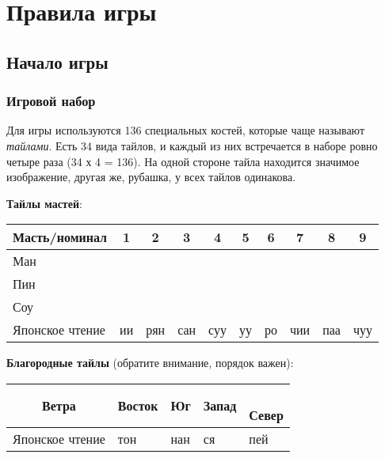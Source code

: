 \section{Правила игры}

\subsection{Начало игры}

\subsubsection{Игровой набор}

Для игры используются 136 специальных костей, которые чаще называют \textit{тайлами}. Есть 34 вида тайлов, и каждый из них встречается в наборе ровно четыре раза (34 х 4 = 136). На одной стороне тайла находится значимое изображение, другая же, рубашка, у всех тайлов одинакова.

\textbf{Тайлы мастей}:

\noindent\begin{tabular}{ C{3.5cm}ccccccccc } 
	\toprule
	Масть/номинал & 1 & 2 & 3 & 4 & 5 & 6 & 7 & 8 & 9 \\
	\midrule
	Ман \newline &  &  &  &  &  &  &  &  &  \rule[1ex]{0pt}{7ex} \\
	\midrule
	Пин \newline &  &  &  &  &  &  &  &  &  \rule[1ex]{0pt}{7ex} \\
	\midrule
	Соу \newline &  &  &  &  &  &  &  &  &  \rule[1ex]{0pt}{7ex} \\
	\midrule
	Японское чтение & ии & рян & сан & суу & уу & ро & чии & паа & чуу \rule[1ex]{0pt}{2ex} \\
	\bottomrule 
\end{tabular}

\vspace{1cm}

\textbf{Благородные тайлы} (обратите внимание, порядок важен):

\noindent\begin{tabular}{ cC{2cm}C{2cm}C{2cm}C{2cm} } 
	\toprule
	 \rule[0ex]{0pt}{7ex} Ветра &  \newline Восток &  \newline Юг &  \newline Запад & { \newline Север} \\
	\midrule
	Японское чтение & тон & нан & ся & пей \\
	\bottomrule
\end{tabular}

